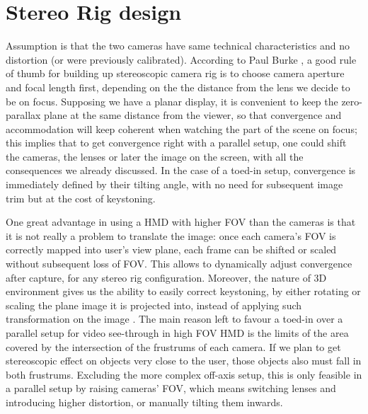 \section{Stereo Rig design}
Assumption is that the two cameras have same technical characteristics and no distortion (or were previously calibrated). According to Paul Burke \cite{stereo_pair_cameras}, a good rule of thumb for building up stereoscopic camera rig is to choose camera aperture and focal length first, depending on the the distance from the lens we decide to be on focus. Supposing we have a planar display, it is convenient to keep the zero-parallax plane at the same distance from the viewer, so that convergence and accommodation will keep coherent when watching the part of the scene on focus; this implies that to get convergence right with a parallel setup, one could shift the cameras, the lenses or later the image on the screen, with all the consequences we already discussed. In the case of a toed-in setup, convergence is immediately defined by their tilting angle, with no need for subsequent image trim but at the cost of keystoning.

One great advantage in using a HMD with higher FOV than the cameras is that it is not really a problem to translate the image: once each camera's FOV is correctly mapped into user's view plane, each frame can be shifted or scaled without subsequent loss of FOV. This allows to dynamically adjust convergence after capture, for any stereo rig configuration. Moreover, the nature of 3D environment gives us the ability to easily correct keystoning, by either rotating or scaling the plane image it is projected into, instead of applying such transformation on the image \cite{keystone_correction}. The main reason left to favour a toed-in over a parallel setup for video see-through in high FOV HMD is the limits of the area covered by the intersection of the frustrums of each camera. If we plan to get stereoscopic effect on objects very close to the user, those objects also must fall in both frustrums. Excluding the more complex off-axis setup, this is only feasible in a parallel setup by raising cameras' FOV, which means switching lenses and introducing higher distortion, or manually tilting them inwards.

